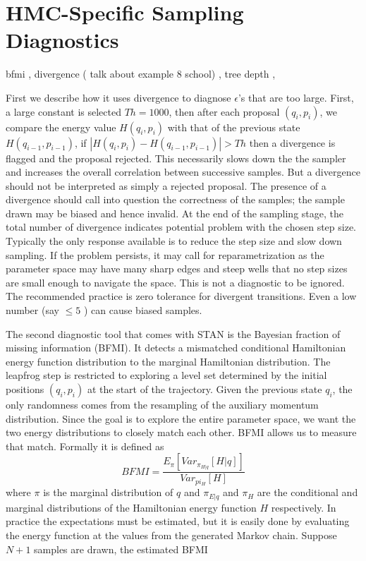 \documentclass[]{report}
\begin{document}
\section{HMC-Specific Sampling Diagnostics}
bfmi , divergence ( talk about example 8 school) , tree depth ,

First we describe how it uses
divergence to diagnose $\epsilon$'s that are too large. First, a large constant
is selected $Th = 1000$, then after each proposal $(q_i,p_i)$, we compare the
energy value $H(q_i,p_i)$ with that of the previous state $H(q_{i-1},p_{i-1})$,
if $|H(q_i,p_i) - H(q_{i-1},p_{i-1})|> Th$ then a divergence is flagged and the
proposal rejected. This necessarily slows down the the sampler and increases the overall correlation between successive samples. But a divergence should not be interpreted as simply a rejected proposal. The presence of a divergence should call into question the correctness of the samples; the sample
drawn may be biased and hence invalid.
 At the end of the sampling stage, the total number of
divergence indicates potential problem with the chosen step size. Typically the
only response available is to reduce the step size and slow down sampling.
If the problem persists, it may call for reparametrization as the parameter
space may have many sharp edges and steep wells that no step sizes are small
enough to navigate the space.  This is not a diagnostic to be ignored. The recommended practice is zero tolerance for divergent transitions. Even a low number (say $\le 5 $ ) can cause biased samples.


The second diagnostic tool that comes with STAN is the Bayesian fraction of
missing information (BFMI). It detects a mismatched conditional Hamiltonian
energy function
distribution to the marginal Hamiltonian distribution. The leapfrog step is
restricted to exploring a level set determined by the 
initial positions $(q_i,p_i)$ at the start of the trajectory. Given the previous 
state $q_i$, the only randomness comes from the resampling of the auxiliary
momentum distribution. Since the goal is
to explore the entire parameter space, we want the two energy distributions to
closely match each other. BFMI allows us to measure that match. Formally it is defined as 
\[ BFMI = \frac{ E_\pi[Var_{\pi_{H|q}}[H|q]]}{Var_{pi_H}[H]} \]
where $\pi$ is the marginal distribution of $q$ and $\pi_{E|q}$ and $\pi_{H}$
are the conditional and marginal distributions of the Hamiltonian energy
function $H$ respectively. In practice the expectations must be estimated, but
it is easily done by evaluating the energy function at the values from the
generated Markov chain. Suppose $N+1$ samples are drawn, the estimated BFMI 
\end{document}
